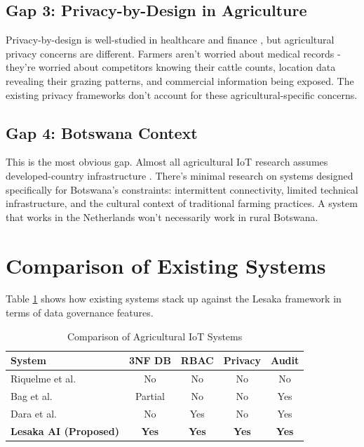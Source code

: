\subsection{Gap 3: Privacy-by-Design in Agriculture}

Privacy-by-design is well-studied in healthcare and finance \cite{cavoukian2011privacy}, but agricultural privacy concerns are different. Farmers aren't worried about medical records - they're worried about competitors knowing their cattle counts, location data revealing their grazing patterns, and commercial information being exposed. The existing privacy frameworks don't account for these agricultural-specific concerns.

\subsection{Gap 4: Botswana Context}

This is the most obvious gap. Almost all agricultural IoT research assumes developed-country infrastructure \cite{botswana_agriculture_2023}. There's minimal research on systems designed specifically for Botswana's constraints: intermittent connectivity, limited technical infrastructure, and the cultural context of traditional farming practices. A system that works in the Netherlands won't necessarily work in rural Botswana.

\section{Comparison of Existing Systems}

Table \ref{tab:comparison} shows how existing systems stack up against the Lesaka framework in terms of data governance features.

\begin{table}[H]
\centering
\caption{Comparison of Agricultural IoT Systems}
\label{tab:comparison}
\begin{tabular}{|l|c|c|c|c|}
\hline
\textbf{System} & \textbf{3NF DB} & \textbf{RBAC} & \textbf{Privacy} & \textbf{Audit} \\
\hline
Riquelme et al. \cite{riquelme2018smonitor} & No & No & No & No \\
Bag et al. \cite{bag2019smart} & Partial & No & No & Yes \\
Dara et al. \cite{dara2018precision} & No & Yes & No & Yes \\
\textbf{Lesaka AI (Proposed)} & \textbf{Yes} & \textbf{Yes} & \textbf{Yes} & \textbf{Yes} \\
\hline
\end{tabular}
\end{table}

